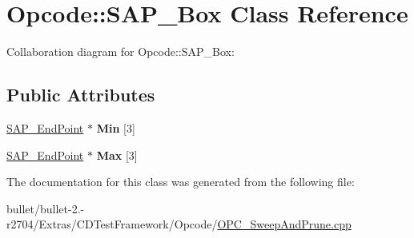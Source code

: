 \hypertarget{class_opcode_1_1_s_a_p___box}{\section{Opcode\+:\+:S\+A\+P\+\_\+\+Box Class Reference}
\label{class_opcode_1_1_s_a_p___box}
}


Collaboration diagram for Opcode\+:\+:S\+A\+P\+\_\+\+Box\+:
\subsection*{Public Attributes}
\begin{DoxyCompactItemize}
\item 
\hypertarget{class_opcode_1_1_s_a_p___box_a5b78918680c5100afc3f1a9ea21ffc9d}{\hyperlink{class_opcode_1_1_s_a_p___end_point}{S\+A\+P\+\_\+\+End\+Point} $\ast$ {\bfseries Min} \mbox{[}3\mbox{]}}\label{class_opcode_1_1_s_a_p___box_a5b78918680c5100afc3f1a9ea21ffc9d}

\item 
\hypertarget{class_opcode_1_1_s_a_p___box_a5e1d6e60a226f3a8db2da654d7a85546}{\hyperlink{class_opcode_1_1_s_a_p___end_point}{S\+A\+P\+\_\+\+End\+Point} $\ast$ {\bfseries Max} \mbox{[}3\mbox{]}}\label{class_opcode_1_1_s_a_p___box_a5e1d6e60a226f3a8db2da654d7a85546}

\end{DoxyCompactItemize}


The documentation for this class was generated from the following file\+:\begin{DoxyCompactItemize}
\item 
bullet/bullet-\/2.-\/r2704/\+Extras/\+C\+D\+Test\+Framework/\+Opcode/\hyperlink{_o_p_c___sweep_and_prune_8cpp}{O\+P\+C\+\_\+\+Sweep\+And\+Prune.\+cpp}\end{DoxyCompactItemize}
